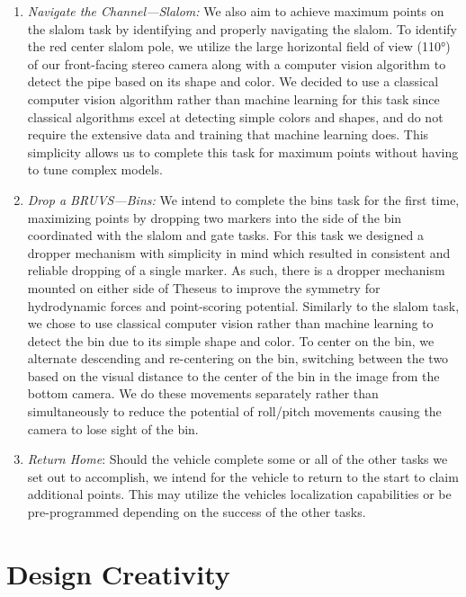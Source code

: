 \documentclass[conference]{IEEEtran}
\begin{document}
\begin{enumerate}
\item \textit{Navigate the Channel---Slalom:}
We also aim to achieve maximum points on the slalom task by identifying and properly navigating the slalom. To identify the red center slalom pole, we utilize the large horizontal field of view (110°) of our front-facing stereo camera along with a computer vision algorithm to detect the pipe based on its shape and color. We decided to use a classical computer vision algorithm rather than machine learning for this task since classical algorithms excel at detecting simple colors and shapes, and do not require the extensive data and training that machine learning does. This simplicity allows us to complete this task for maximum points without having to tune complex models.

\item \textit{Drop a BRUVS---Bins:} We intend to complete the bins task for the first time, maximizing points by dropping two markers into the side of the bin coordinated with the slalom and gate tasks. For this task we designed a dropper mechanism with simplicity in mind which resulted in consistent and reliable dropping of a single marker. As such, there is a dropper mechanism mounted on either side of Theseus to improve the symmetry for hydrodynamic forces and point-scoring potential. Similarly to the slalom task, we chose to use classical computer vision rather than machine learning to detect the bin due to its simple shape and color. To center on the bin, we alternate descending and re-centering on the bin, switching between the two based on the visual distance to the center of the bin in the image from the bottom camera. We do these movements separately rather than simultaneously to reduce the potential of roll/pitch movements causing the camera to lose sight of the bin. 

\item \textit{Return Home}: Should the vehicle complete some or all of the other tasks we set out to accomplish, we intend for the vehicle to return to the start to claim additional points. This may utilize the vehicles localization capabilities or be pre-programmed depending on the success of the other tasks.
\end{enumerate}



\section{Design Creativity}
\label{sec:design}
\end{document}

